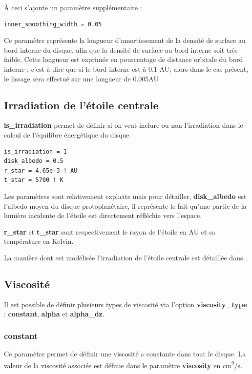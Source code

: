 \bigskip

À ceci s'ajoute un paramètre supplémentaire : 
\begin{verbatim}
inner_smoothing_width = 0.05
\end{verbatim}

Ce paramètre représente la longueur d'amortissement de la densité de surface au bord interne du disque, afin que la densité de surface au bord interne soit très faible. Cette longueur est exprimée en pourcentage de distance orbitale du bord interne ; c'est à dire que si le bord interne est à 0.1 AU, alors dans le cas présent, le lissage sera effectué sur une longueur de 0.005AU

\subsection{Irradiation de l'étoile centrale}
\textbf{is\_irradiation} permet de définir si on veut inclure ou non l'irradiation dans le calcul de l'équilibre énergétique du disque. 

\begin{verbatim}
is_irradiation = 1
disk_albedo = 0.5
r_star = 4.65e-3 ! AU
t_star = 5700 ! K
\end{verbatim}

Les paramètres sont relativement explicite mais pour détailler, \textbf{disk\_albedo} est l'albedo moyen du disque protoplanétaire, il représente le fait qu'une partie de la lumière incidente de l'étoile est directement réfléchie vers l'espace.

\textbf{r\_star} et \textbf{t\_star} sont respectivement le rayon de l'étoile en AU et sa température en Kelvin.

La manière dont est modélisée l'irradiation de l'étoile centrale est détaillée dans .

\subsection{Viscosité}
Il est possible de définir plusieurs types de viscosité via l'option \textbf{viscosity\_type} : \textbf{constant}, \textbf{alpha} et \textbf{alpha\_dz}.

\subsubsection{constant}
Ce paramètre permet de définir une viscosité $\nu$ constante dans tout le disque. La valeur de la viscosité associée est définie dans le paramètre \textbf{viscosity} en \unit{cm^2/s}.

